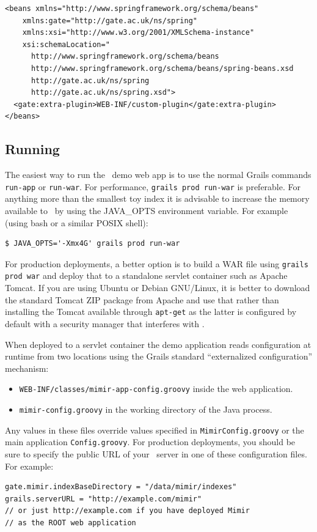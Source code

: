 \begin{lstlisting}
<beans xmlns="http://www.springframework.org/schema/beans"
    xmlns:gate="http://gate.ac.uk/ns/spring"
    xmlns:xsi="http://www.w3.org/2001/XMLSchema-instance"
    xsi:schemaLocation="
      http://www.springframework.org/schema/beans
      http://www.springframework.org/schema/beans/spring-beans.xsd
      http://gate.ac.uk/ns/spring
      http://gate.ac.uk/ns/spring.xsd">
  <gate:extra-plugin>WEB-INF/custom-plugin</gate:extra-plugin>
</beans>
\end{lstlisting}

\subsection{Running}

The easiest way to run the \Mimir\ demo web app is to use the normal Grails
commands {\tt run-app} or {\tt run-war}.  For performance, {\tt grails prod
run-war} is preferable.  For anything more than the smallest toy index it is
advisable to increase the memory available to \Mimir\ by using the JAVA\_OPTS
environment variable.  For example (using bash or a similar POSIX shell):
\begin{verbatim}
$ JAVA_OPTS='-Xmx4G' grails prod run-war
\end{verbatim}

For production deployments, a better option is to build a WAR file using
{\tt grails prod war} and deploy that to a standalone servlet container such as
Apache Tomcat.  If you are using Ubuntu or Debian GNU/Linux, it is better to
download the standard Tomcat ZIP package from Apache and use that rather than
installing the Tomcat available through {\tt apt-get} as the latter is
configured by default with a security manager that interferes with \Mimir.

When deployed to a servlet container the demo application reads configuration
at runtime from two locations using the Grails standard ``externalized
configuration'' mechanism:
\begin{itemize}
\item {\tt WEB-INF/classes/mimir-app-config.groovy} inside the web application.
\item {\tt mimir-config.groovy} in the working directory of the Java process.
\end{itemize}

Any values in these files override values specified in {\tt MimirConfig.groovy}
or the main application {\tt Config.groovy}.  For production deployments, you
should be sure to specify the public URL of your \Mimir\ server in one of these
configuration files.  For example:
\begin{lstlisting}
gate.mimir.indexBaseDirectory = "/data/mimir/indexes"
grails.serverURL = "http://example.com/mimir"
// or just http://example.com if you have deployed Mimir
// as the ROOT web application
\end{lstlisting}

